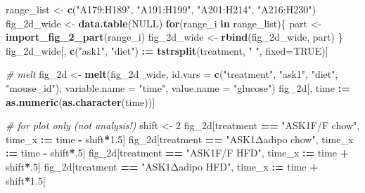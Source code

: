 \documentclass[]{book}
\newenvironment{Shaded}{\begin{snugshade}}{\end{snugshade}}
\newcommand{\CommentTok}[1]{\textcolor[rgb]{0.56,0.35,0.01}{\textit{#1}}}
\newcommand{\ControlFlowTok}[1]{\textcolor[rgb]{0.13,0.29,0.53}{\textbf{#1}}}
\newcommand{\DataTypeTok}[1]{\textcolor[rgb]{0.13,0.29,0.53}{#1}}
\newcommand{\DecValTok}[1]{\textcolor[rgb]{0.00,0.00,0.81}{#1}}
\newcommand{\ErrorTok}[1]{\textcolor[rgb]{0.64,0.00,0.00}{\textbf{#1}}}
\newcommand{\FloatTok}[1]{\textcolor[rgb]{0.00,0.00,0.81}{#1}}
\newcommand{\KeywordTok}[1]{\textcolor[rgb]{0.13,0.29,0.53}{\textbf{#1}}}
\newcommand{\NormalTok}[1]{#1}
\newcommand{\OperatorTok}[1]{\textcolor[rgb]{0.81,0.36,0.00}{\textbf{#1}}}
\newcommand{\OtherTok}[1]{\textcolor[rgb]{0.56,0.35,0.01}{#1}}
\newcommand{\StringTok}[1]{\textcolor[rgb]{0.31,0.60,0.02}{#1}}
\begin{document}
\begin{Shaded}
\begin{Highlighting}[]
\NormalTok{range_list <-}\StringTok{ }\KeywordTok{c}\NormalTok{(}\StringTok{"A179:H189"}\NormalTok{, }\StringTok{"A191:H199"}\NormalTok{, }\StringTok{"A201:H214"}\NormalTok{, }\StringTok{"A216:H230"}\NormalTok{)}
\NormalTok{fig_2d_wide <-}\StringTok{ }\KeywordTok{data.table}\NormalTok{(}\OtherTok{NULL}\NormalTok{)}
\ControlFlowTok{for}\NormalTok{(range_i }\ControlFlowTok{in}\NormalTok{ range_list)\{}
\NormalTok{  part <-}\StringTok{ }\KeywordTok{import_fig_2_part}\NormalTok{(range_i)}
\NormalTok{  fig_2d_wide <-}\StringTok{ }\KeywordTok{rbind}\NormalTok{(fig_2d_wide,}
\NormalTok{                       part)}
\NormalTok{\}}
\NormalTok{fig_2d_wide[, }\KeywordTok{c}\NormalTok{(}\StringTok{"ask1"}\NormalTok{, }\StringTok{"diet"}\NormalTok{) }\OperatorTok{:}\ErrorTok{=}\StringTok{ }\KeywordTok{tstrsplit}\NormalTok{(treatment, }\StringTok{" "}\NormalTok{, }\DataTypeTok{fixed=}\OtherTok{TRUE}\NormalTok{)]}

\CommentTok{# melt}
\NormalTok{fig_2d <-}\StringTok{ }\KeywordTok{melt}\NormalTok{(fig_2d_wide,}
               \DataTypeTok{id.vars =} \KeywordTok{c}\NormalTok{(}\StringTok{"treatment"}\NormalTok{,}
                           \StringTok{"ask1"}\NormalTok{,}
                           \StringTok{"diet"}\NormalTok{,}
                           \StringTok{"mouse_id"}\NormalTok{),}
               \DataTypeTok{variable.name =} \StringTok{"time"}\NormalTok{,}
               \DataTypeTok{value.name =} \StringTok{"glucose"}\NormalTok{)}
\NormalTok{fig_2d[, time }\OperatorTok{:}\ErrorTok{=}\StringTok{ }\KeywordTok{as.numeric}\NormalTok{(}\KeywordTok{as.character}\NormalTok{(time))]}

\CommentTok{# for plot only (not analysis!)}
\NormalTok{shift <-}\StringTok{ }\DecValTok{2}
\NormalTok{fig_2d[treatment }\OperatorTok{==}\StringTok{ "ASK1F/F chow"}\NormalTok{, time_x }\OperatorTok{:}\ErrorTok{=}\StringTok{ }\NormalTok{time }\OperatorTok{-}\StringTok{ }\NormalTok{shift}\OperatorTok{*}\FloatTok{1.5}\NormalTok{]}
\NormalTok{fig_2d[treatment }\OperatorTok{==}\StringTok{ "ASK1Δadipo chow"}\NormalTok{, time_x }\OperatorTok{:}\ErrorTok{=}\StringTok{ }\NormalTok{time }\OperatorTok{-}\StringTok{ }\NormalTok{shift}\OperatorTok{*}\NormalTok{.}\DecValTok{5}\NormalTok{]}
\NormalTok{fig_2d[treatment }\OperatorTok{==}\StringTok{ "ASK1F/F HFD"}\NormalTok{, time_x }\OperatorTok{:}\ErrorTok{=}\StringTok{ }\NormalTok{time }\OperatorTok{+}\StringTok{ }\NormalTok{shift}\OperatorTok{*}\NormalTok{.}\DecValTok{5}\NormalTok{]}
\NormalTok{fig_2d[treatment }\OperatorTok{==}\StringTok{ "ASK1Δadipo HFD"}\NormalTok{, time_x }\OperatorTok{:}\ErrorTok{=}\StringTok{ }\NormalTok{time }\OperatorTok{+}\StringTok{ }\NormalTok{shift}\OperatorTok{*}\FloatTok{1.5}\NormalTok{]}
\end{Highlighting}
\end{Shaded}
\end{document}
